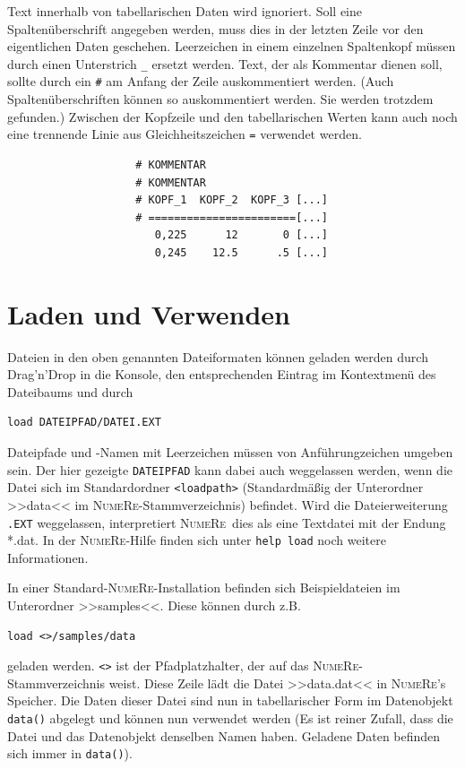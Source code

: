 \documentclass[DIV=14,headsepline,footsepline]{scrbook}
\newcommand{\NR}{\textsc{Nu\-me\-Re}}
\begin{document}
				Text innerhalb von tabellarischen Daten wird ignoriert. Soll eine Spaltenüberschrift angegeben werden, muss dies in der letzten Zeile vor den eigentlichen Daten geschehen. Leerzeichen in einem einzelnen Spaltenkopf müssen durch einen Unterstrich \verb+_+ ersetzt werden. Text, der als Kommentar dienen soll, sollte durch ein \verb+#+ am Anfang der Zeile auskommentiert werden. (Auch Spaltenüberschriften können so auskommentiert werden. Sie werden trotzdem gefunden.) Zwischen der Kopfzeile und den tabellarischen Werten kann auch noch eine trennende Linie aus Gleichheitszeichen \verb+=+ verwendet werden.
				\begin{verbatim}
					# KOMMENTAR
					# KOMMENTAR
					# KOPF_1  KOPF_2  KOPF_3 [...]
					# =======================[...]
					   0,225      12       0 [...]
					   0,245    12.5      .5 [...]
				\end{verbatim}
				
			\section{Laden und Verwenden}
				Dateien in den oben genannten Dateiformaten können geladen werden durch Drag'n'Drop in die Konsole, den entsprechenden Eintrag im Kontextmenü des Dateibaums und durch
				\begin{lstlisting}
load DATEIPFAD/DATEI.EXT
				\end{lstlisting}
				Dateipfade und -Namen mit Leerzeichen müssen von Anführungzeichen umgeben sein. Der hier gezeigte \verb+DATEIPFAD+ kann dabei auch weggelassen werden, wenn die Datei sich im Standardordner \verb+<loadpath>+ (Standardmäßig der Unterordner >>data<< im \NR-Stammverzeichnis) befindet. Wird die Dateierweiterung \verb+.EXT+ weggelassen, interpretiert \NR\ dies als eine Textdatei mit der Endung *.dat. In der \NR-Hilfe finden sich unter \verb+help load+ noch weitere Informationen.
				
				In einer Standard-\NR-Installation befinden sich Beispieldateien im Unterordner >>samples<<. Diese können durch z.B.
				\begin{lstlisting}
load <>/samples/data
				\end{lstlisting}
				geladen werden. \verb+<>+ ist der Pfadplatzhalter, der auf das \NR-Stammverzeichnis weist. Diese Zeile lädt die Datei >>data.dat<< in \NR's Speicher. Die Daten dieser Datei sind nun in tabellarischer Form im Datenobjekt \verb+data()+ abgelegt und können nun verwendet werden (Es ist reiner Zufall, dass die Datei und das Datenobjekt denselben Namen haben. Geladene Daten befinden sich immer in \verb+data()+).
				
\end{document}
